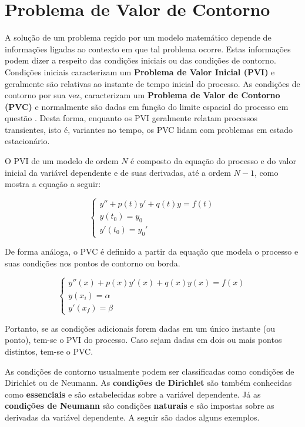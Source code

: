 \section{Problema de Valor de Contorno}


A solução de um problema regido por um modelo matemático depende de informações ligadas ao contexto em que tal problema ocorre.
Estas informações podem dizer a respeito das condições iniciais ou das condições de contorno. 
Condições iniciais caracterizam um \textbf{Problema de Valor Inicial (PVI)} e geralmente são relativas ao instante de tempo inicial do processo.
As condições de contorno por sua vez, caracterizam um \textbf{Problema de Valor de Contorno (PVC)} e  normalmente são dadas em função do limite espacial do processo em questão
\citep[p. 447]{boyce_diprima}.
Desta forma, enquanto os PVI geralmente relatam processos transientes, isto é, variantes no tempo, os PVC lidam com problemas em estado estacionário.

O PVI de um modelo de ordem $N$ é composto da equação do processo e do valor inicial da variável dependente e de suas derivadas, até a ordem $N-1$, como mostra a equação a seguir:

\begin{equation}
	\begin{cases}
		y'' + p(t)y' + q(t)y = f(t) \\
		y(t_0) = y_0 \\
		y'(t_0) = y_0'
	\end{cases}
\end{equation}

De forma análoga, o PVC é definido a partir da equação que modela o processo e suas condições nos pontos de contorno ou borda.

\begin{equation}
	\begin{cases}
		y''(x) + p(x)y'(x) + q(x)y(x) = f(x) \\
		y(x_i) = \alpha \\
		y'(x_f) = \beta
	\end{cases}
\end{equation}

Portanto, se as condições adicionais forem dadas em um único instante (ou ponto), tem-se o PVI do processo. Caso sejam dadas em dois ou mais pontos distintos, tem-se o PVC.

As condições de contorno usualmente podem ser classificadas como condições de Dirichlet ou de Neumann. 
As \textbf{condições de Dirichlet} são também conhecidas como \textbf{essenciais} e são estabelecidas sobre a variável dependente. Já as \textbf{condições de Neumann} são condições \textbf{naturais} e são impostas sobre as derivadas da variável dependente. A seguir são dados alguns exemplos.

